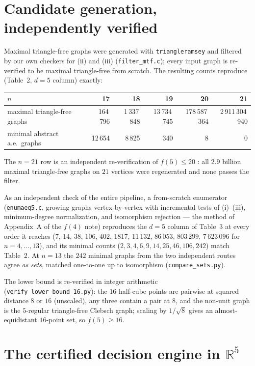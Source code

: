 \documentclass[11pt]{article}
\newcommand{\R}{\mathbb{R}}
\begin{document}
\section*{Candidate generation, independently verified}

Maximal triangle-free graphs were generated with \texttt{triangleramsey}
\cite{BGS,BBH} and filtered by our own checkers for (ii) and (iii)
(\texttt{filter\_mtf.c}); every input graph is re-verified to be maximal
triangle-free from scratch. The resulting counts reproduce
\cite{BPSSV} (Table~2, $d=5$ column) exactly:

\begin{center}
\begin{tabular}{lrrrrr}
\toprule
$n$ & 17 & 18 & 19 & 20 & 21\\
\midrule
maximal triangle-free graphs & 164\,796 & 1\,337\,848 & 13\,734\,745 &
178\,587\,364 & 2\,911\,304\,940\\
minimal abstract a.e.\ graphs & 12\,654 & 8\,825 & 340 & 8 & 0\\
\bottomrule
\end{tabular}
\end{center}

The $n=21$ row is an independent re-verification of $f(5)\le 20$
\cite{BPSSV}: all $2.9$ billion maximal triangle-free graphs on $21$
vertices were regenerated and none passes the filter.

As an independent check of the entire pipeline, a from-scratch enumerator
(\texttt{enumaeq5.c}, growing graphs vertex-by-vertex with incremental
tests of (i)--(iii), minimum-degree normalization, and isomorphism
rejection --- the method of Appendix~A of the $f(4)$ note) reproduces the
$d=5$ column of \cite{BPSSV} Table~3 at every order it reaches
($7$, $14$, $38$, $106$, $402$, $1817$, $11\,132$, $86\,053$, $803\,299$,
$7\,623\,096$ for $n=4,\dots,13$), and its minimal counts
($2,3,4,6,9,14,25,46,106,242$) match Table~2. At $n=13$ the $242$ minimal
graphs from the two independent routes agree \emph{as sets}, matched
one-to-one up to isomorphism (\texttt{compare\_sets.py}).

The lower bound is re-verified in integer arithmetic
(\texttt{verify\_lower\_bound\_16.py}): the $16$ half-cube points are
pairwise at squared distance $8$ or $16$ (unscaled), any three contain a
pair at $8$, and the non-unit graph is the $5$-regular triangle-free
Clebsch graph; scaling by $1/\sqrt8$ gives an almost-equidistant $16$-point
set, so $f(5)\ge 16$.

\section*{The certified decision engine in $\R^5$}
\end{document}

